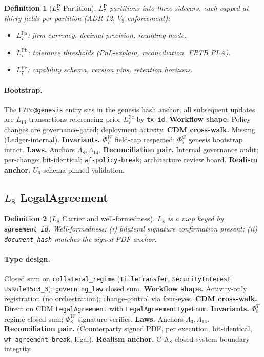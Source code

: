\documentclass[11pt,a4paper]{article}
\newtheorem{definition}{Definition}[section]
\begin{document}
\begin{definition}[$L_7^{\mathrm{P}}$ Partition]
$L_7^{\mathrm{P}}$ partitions into three sidecars, each capped at thirty fields per partition (ADR-12, $V_9$ enforcement):
\begin{itemize}[nosep]
\item $L_7^{\mathrm{Pa}}$: firm currency, decimal precision, rounding mode.
\item $L_7^{\mathrm{Pb}}$: tolerance thresholds (PnL-explain, reconciliation, FRTB PLA).
\item $L_7^{\mathrm{Pc}}$: capability schema, version pins, retention horizons.
\end{itemize}
\end{definition}

\paragraph{Bootstrap.} The \texttt{L7Pc@genesis} entry sits in the genesis hash anchor; all subsequent updates are $L_{13}$ transactions referencing prior $L_7^{\mathrm{Pc}}$ by \texttt{tx\_id}. \textbf{Workflow shape.} Policy changes are governance-gated; deployment activity. \textbf{CDM cross-walk.} Missing (Ledger-internal). \textbf{Invariants.} $\Phi_7^W$ field-cap respected; $\Phi_7^C$ genesis bootstrap intact. \textbf{Laws.} Anchors $\Lambda_8, \Lambda_{14}$. \textbf{Reconciliation pair.} Internal governance audit; per-change; bit-identical; \texttt{wf-policy-break}; architecture review board. \textbf{Realism anchor.} $U_6$ schema-pinned validation.

\subsection{$L_8$ LegalAgreement}
\label{sec:leaf-l8}

\begin{definition}[$L_8$ Carrier and well-formedness]
$L_8$ is a map keyed by \texttt{agreement\_id}. Well-formedness: (i) bilateral signature confirmation present; (ii) \texttt{document\_hash} matches the signed PDF anchor.
\end{definition}

\paragraph{Type design.} Closed sum on \texttt{collateral\_regime} (\texttt{TitleTransfer}, \texttt{SecurityInterest}, \texttt{UsRule15c3\_3}); \texttt{governing\_law} closed sum. \textbf{Workflow shape.} Activity-only registration (no orchestration); change-control via four-eyes. \textbf{CDM cross-walk.} Direct on CDM \texttt{LegalAgreement} with \texttt{LegalAgreementTypeEnum}. \textbf{Invariants.} $\Phi_8^T$ regime closed sum; $\Phi_8^W$ signature verifies. \textbf{Laws.} Anchors $\Lambda_3, \Lambda_{14}$. \textbf{Reconciliation pair.} (Counterparty signed PDF, per execution, bit-identical, \texttt{wf-agreement-break}, legal). \textbf{Realism anchor.} $\mathrm{C\textrm{-}A}_8$ closed-system boundary integrity.
\end{document}
